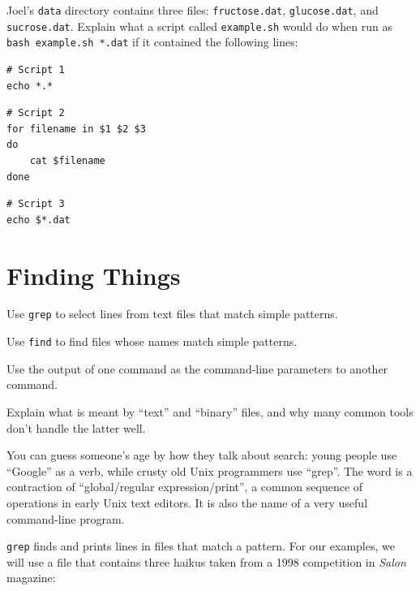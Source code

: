 \documentclass{book}
\begin{document}
\begin{challenge}
  Joel's \texttt{data} directory contains three files:
  \texttt{fructose.dat}, \texttt{glucose.dat}, and \texttt{sucrose.dat}.
  Explain what a script called \texttt{example.sh} would do when run as
  \texttt{bash example.sh *.dat} if it contained the following lines:

\begin{verbatim}
# Script 1
echo *.*
\end{verbatim}

\begin{verbatim}
# Script 2
for filename in $1 $2 $3
do
    cat $filename
done
\end{verbatim}

\begin{verbatim}
# Script 3
echo $*.dat
\end{verbatim}

\end{challenge}

\section{Finding Things}

\begin{objectives}
\begin{swcitemize}
\item
  Use \texttt{grep} to select lines from text files that match simple
  patterns.
\item
  Use \texttt{find} to find files whose names match simple patterns.
\item
  Use the output of one command as the command-line parameters to
  another command.
\item
  Explain what is meant by ``text'' and ``binary'' files, and why many
  common tools don't handle the latter well.
\end{swcitemize}
\end{objectives}

You can guess someone's age by how they talk about search: young people
use ``Google'' as a verb, while crusty old Unix programmers use
``grep''. The word is a contraction of ``global/regular
expression/print'', a common sequence of operations in early Unix text
editors. It is also the name of a very useful command-line program.

\texttt{grep} finds and prints lines in files that match a pattern. For
our examples, we will use a file that contains three haikus taken from a
1998 competition in \emph{Salon} magazine:
\end{document}
